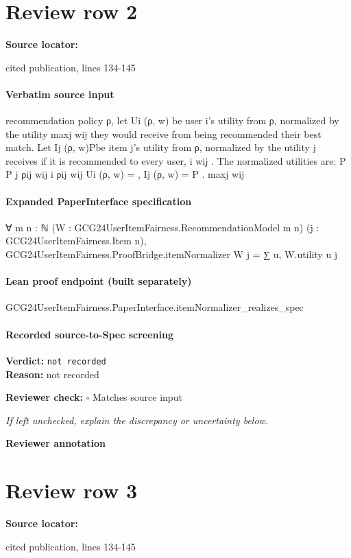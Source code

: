 \documentclass[10pt]{article}
\newcommand{\reviewerbox}{%
  \par\noindent\fbox{\parbox{0.96\linewidth}{\rule{0pt}{0.38in}}}\par
}
\newcommand{\reviewmatch}[1]{%
  \par\noindent\textbf{Reviewer check:} $\square$\; #1\par
  \noindent\emph{If left unchecked, explain the discrepancy or uncertainty below.}\par
}
\begin{document}
\section*{Review row 2}
\textbf{Source locator:} {\footnotesize\raggedright cited publication, lines 134-\allowbreak{}145\par}
\paragraph{Verbatim source input}
\begin{ReviewVerbatim}
recommendation policy ρ, let Ui (ρ, w) be user i’s utility from ρ, normalized by the utility maxj wij
they would receive from being recommended their best match. Let Ij (ρ, w)Pbe item j’s utility from
ρ, normalized by the utility j receives if it is recommended to every user, i wij . The normalized
utilities are:
P
P
j ρij wij
i ρij wij
Ui (ρ, w) =
, Ij (ρ, w) = P
.
maxj wij
\end{ReviewVerbatim}


\paragraph{Expanded PaperInterface specification}
\begin{ReviewVerbatim}
∀ {m n : ℕ} (W : GCG24UserItemFairness.RecommendationModel m n) (j : GCG24UserItemFairness.Item n),
  GCG24UserItemFairness.ProofBridge.itemNormalizer W j = ∑ u, W.utility u j
\end{ReviewVerbatim}

\paragraph{Lean proof endpoint (built separately)}\begin{ReviewVerbatim}
GCG24UserItemFairness.PaperInterface.itemNormalizer_realizes_spec
\end{ReviewVerbatim}

\paragraph{Recorded source-to-Spec screening}
\textbf{Verdict:} \texttt{not recorded}
\\
\textbf{Reason:} not recorded
\reviewmatch{Matches source input}
\noindent\textbf{Reviewer annotation}\par
\reviewerbox
\clearpage
\hypertarget{source-claim-8a9fd6e3ecb98f56}{}
\section*{Review row 3}
\textbf{Source locator:} {\footnotesize\raggedright cited publication, lines 134-\allowbreak{}145\par}
\end{document}
